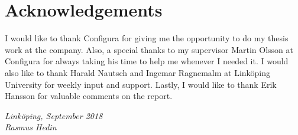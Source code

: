 
\chapter*{Acknowledgements}

I would like to thank Configura for giving me the opportunity to do my thesis work at the company. Also, a special thanks to my supervisor Martin Olsson at Configura for always taking his time to help me whenever I needed it. I would also like to thank Harald Nautsch and Ingemar Ragnemalm at Linköping University for weekly input and support. Lastly, I would like to thank Erik Hansson for valuable comments on the report.

\begin{flushright}
  \textit{Linköping, September 2018} \\
  \textit{Rasmus Hedin}
\end{flushright}
  




